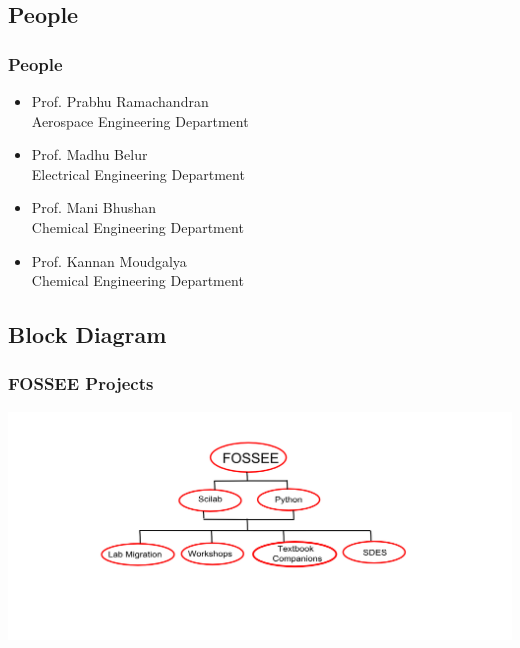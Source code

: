\documentclass[compress,red]{beamer} %
\begin{document}
\subsection{People}
\begin{frame}
\frametitle{People}
\begin{itemize}
\item Prof. Prabhu Ramachandran \\ 
{\footnotesize Aerospace Engineering Department} \pause
\item Prof. Madhu Belur \\
{\footnotesize Electrical Engineering Department} \pause
\item Prof. Mani Bhushan \\
{\footnotesize Chemical Engineering Department}  \pause
\item Prof. Kannan Moudgalya \\
{\footnotesize Chemical Engineering Department}  
\end{itemize}
\end{frame}

\subsection{Block Diagram}
\begin{frame}
\frametitle{FOSSEE Projects}
\begin{center}
\includegraphics[scale=0.3]{blockdiagram.png}
\end{center}
\end{frame}
\end{document}
